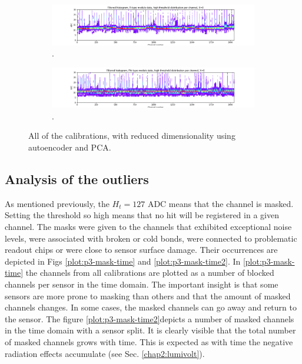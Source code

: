 \begin{figure}
    \centering
    
    \begin{subfigure}[b]{\textwidth}
    \includegraphics[width=\linewidth]{figures/chapter4/calib_analysis/P2-only-good-R.png}
    \caption{ .}
   \label{plot:only_good_r}
  \end{subfigure}
  
  \begin{subfigure}[b]{\textwidth}
    \includegraphics[width=\linewidth]{figures/chapter4/calib_analysis/P2-only-good-phi.png}
    \caption{ .}
   \label{plot:only_good_phi}
  \end{subfigure}
      \caption[All calond]{All of the calibrations, with reduced dimensionality using autoencoder and PCA.}
    \label{plot:only_good_all}
  
  \end{figure}

\subsection{Analysis of the outliers}
\label{chap4:masks}
As mentioned previously, the $H_t=127$ ADC means that the channel is masked.
Setting the threshold so high means that no hit will be registered in a given channel.
The masks were given to the channels that exhibited exceptional noise levels, were associated with broken or cold bonds, were connected to problematic readout chips or were close to sensor surface damage.
Their occurrences are depicted in Figs \ref{plot:p3-mask-time} and \ref{plot:p3-mask-time2}.
In  \ref{plot:p3-mask-time} the channels from all calibrations are plotted as a number of blocked channels per sensor in the time domain.
The important insight is that some sensors are more prone to masking than others and that the amount of masked channels changes.
In some cases, the masked channels can go away and return to the sensor.
The figure \ref{plot:p3-mask-time2}depicts a number of masked channels in the time domain with a sensor split.
It is clearly visible that the total number of masked channels grows with time.
This is expected as with time the negative radiation effects accumulate (see Sec. \ref{chap2:lumivolt}).

